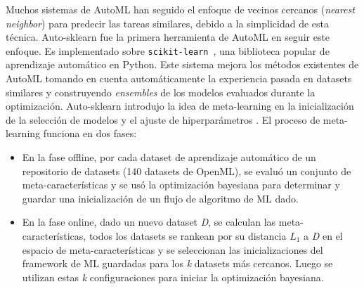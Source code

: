 Muchos sistemas de AutoML han seguido el enfoque de vecinos cercanos (\textit{nearest neighbor}) para predecir las tareas similares, debido a la simplicidad de esta técnica. Auto-sklearn \cite{fuerer2015efficient} fue la primera herramienta de AutoML en seguir este enfoque. Es implementado sobre \texttt{scikit-learn}~\cite{scikit-learn}, una biblioteca popular de aprendizaje automático en Python. 
Este sistema mejora los métodos existentes de AutoML tomando en cuenta automáticamente la experiencia pasada en datasets similares y construyendo \textit{ensembles} de los modelos evaluados durante la optimización. Auto-sklearn introdujo la idea de meta-learning en la inicialización de la selección de modelos y el ajuste de hiperparámetros \cite{vanschoren2018metalearning}.  El proceso de meta-learning funciona en dos fases:

\begin{itemize}
	\item En la fase offline, por cada dataset de aprendizaje automático de un repositorio de datasets (140 datasets de OpenML), se evaluó un conjunto de meta-características  y se usó la optimización bayesiana para determinar y guardar una inicialización de un flujo de algoritmo de ML dado.
	\item En la fase online, dado un nuevo dataset \textit{D}, se calculan las meta-características, todos los datasets se rankean por su distancia $L_1$ a \textit{D} en el espacio de meta-características y se seleccionan las inicializaciones del framework de ML guardadas para los \textit{k} datasets más cercanos. Luego se utilizan estas \textit{k} configuraciones para iniciar la optimización bayesiana.
\end{itemize}

